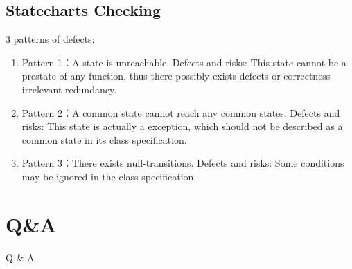 ﻿\documentclass{beamer}
\begin{document}
\subsection{Statecharts Checking}
\begin{frame}{3 patterns of defects:}
  \begin{enumerate}
  \item Pattern 1：A state is unreachable. Defects and risks: This state cannot be a prestate of any function, thus there possibly exists defects or correctness-irrelevant redundancy. \pause
  \item Pattern 2：A common state cannot reach any common states. Defects and risks: This state is actually a exception, which should not be described as a common state in its class specification. \pause
  \item Pattern 3：There exists null-transitions. Defects and risks: Some conditions may be ignored in the class specification.
  \end{enumerate}
\end{frame}



\section{Q\&A}
\begin{frame}
  \begin{center}
    \Huge{Q \& A}
  \end{center}
\end{frame}
\end{document}
